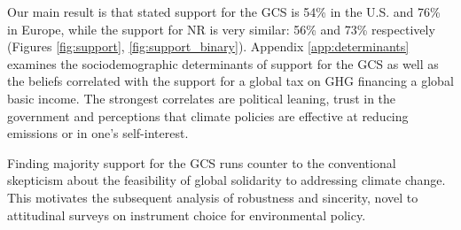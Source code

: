 \begin{bibunit}
Our main result is that stated support for the GCS is 54\% in the U.S. and 76\% in Europe, while the support for NR is very similar: 56\% and 73\% respectively (Figures \ref{fig:support}, \ref{fig:support_binary}). 
Appendix \ref{app:determinants} examines the sociodemographic determinants of support for the GCS as well as the beliefs correlated with the support for a global tax on GHG financing a global basic income. The strongest correlates are political leaning, trust in the government and perceptions that climate policies are effective at reducing emissions or in one's self-interest. 

Finding majority support for the GCS runs counter to the conventional skepticism about the feasibility of global solidarity to addressing climate change. %
This motivates the subsequent analysis of robustness and sincerity, novel to attitudinal surveys on instrument choice for environmental policy.  %




\end{bibunit}
